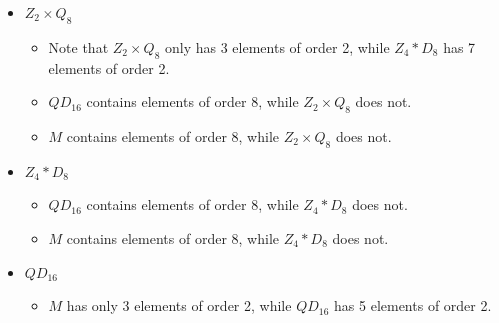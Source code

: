 \begin{sol}
\begin{itemize}
\begin{itemize}
            \item Note that $\bar{(x^k, q)} \in Z_4 \ast Q_8 \cong Z_4 \ast D_8$ has order 2 when $(x^k, q)^2 = (1, 1)$ or $(x^2, -1)$.
	Since we already identify $x^2$ with $-1$ in the quotient, the case of $q^2 = 1$ and $2i \equiv 0 \bmod 4$ gives the same element, hence only 1 element of order 2.
	The other case of $q^2 = -1$ and $2i \equiv 2 \bmod 4$, or $i$ odd and $q = Q_8 \setminus Z(Q_8)$ gives 6 elements of order 2, for a total of 7 elements of order 2 in $Z_4 \ast D_8$, while $Z_2 \times D_8$ has 11 elements of order 2.
            \item $QD_{16}$ contains elements of order 8, while $Z_2 \times D_8$ does not.
            \item $M$ contains elements of order 8, while $Z_2 \times D_8$ does not.
        \end{itemize}
        \item $Z_2 \times Q_8$
        \begin{itemize}
            \item Note that $Z_2 \times Q_8$ only has 3 elements of order 2, while $Z_4 \ast D_8$ has 7 elements of order 2.
            \item $QD_{16}$ contains elements of order 8, while $Z_2 \times Q_8$ does not.
            \item $M$ contains elements of order 8, while $Z_2 \times Q_8$ does not.
        \end{itemize}
        \item $Z_4 \ast D_8$
        \begin{itemize}
            \item $QD_{16}$ contains elements of order 8, while $Z_4 \ast D_8$ does not.
            \item $M$ contains elements of order 8, while $Z_4 \ast D_8$ does not.
        \end{itemize}
        \item $QD_{16}$
        \begin{itemize}
            \item $M$ has only 3 elements of order 2, while $QD_{16}$ has 5 elements of order 2. \qedhere
        \end{itemize}
    \end{itemize}
\end{sol}